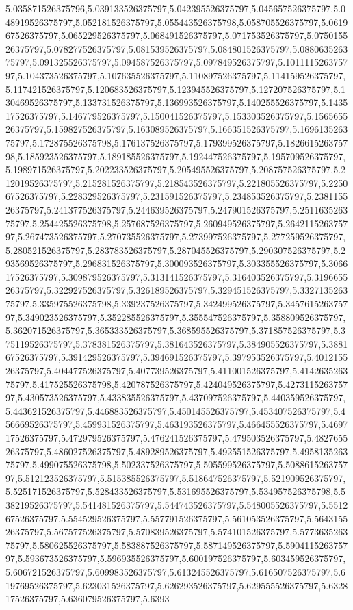 5.035871526375796,5.039133526375797,5.042395526375797,5.045657526375797,5.048919526375797,5.052181526375797,5.055443526375798,5.058705526375797,5.061967526375797,5.065229526375797,5.068491526375797,5.071753526375797,5.075015526375797,5.078277526375797,5.081539526375797,5.084801526375797,5.088063526375797,5.091325526375797,5.094587526375797,5.097849526375797,5.101111526375797,5.104373526375797,5.107635526375797,5.110897526375797,5.114159526375797,5.117421526375797,5.120683526375797,5.123945526375797,5.127207526375797,5.130469526375797,5.133731526375797,5.136993526375797,5.140255526375797,5.143517526375797,5.146779526375797,5.150041526375797,5.153303526375797,5.156565526375797,5.159827526375797,5.163089526375797,5.166351526375797,5.169613526375797,5.172875526375798,5.176137526375797,5.179399526375797,5.182661526375798,5.185923526375797,5.189185526375797,5.192447526375797,5.195709526375797,5.198971526375797,5.202233526375797,5.205495526375797,5.208757526375797,5.212019526375797,5.215281526375797,5.218543526375797,5.221805526375797,5.225067526375797,5.228329526375797,5.231591526375797,5.234853526375797,5.238115526375797,5.241377526375797,5.244639526375797,5.247901526375797,5.251163526375797,5.254425526375798,5.257687526375797,5.260949526375797,5.264211526375797,5.267473526375797,5.270735526375797,5.273997526375797,5.277259526375797,5.280521526375797,5.283783526375797,5.287045526375797,5.290307526375797,5.293569526375797,5.296831526375797,5.300093526375797,5.303355526375797,5.306617526375797,5.309879526375797,5.313141526375797,5.316403526375797,5.319665526375797,5.322927526375797,5.326189526375797,5.329451526375797,5.332713526375797,5.335975526375798,5.339237526375797,5.342499526375797,5.345761526375797,5.349023526375797,5.352285526375797,5.355547526375797,5.358809526375797,5.362071526375797,5.365333526375797,5.368595526375797,5.371857526375797,5.375119526375797,5.378381526375797,5.381643526375797,5.384905526375797,5.388167526375797,5.391429526375797,5.394691526375797,5.397953526375797,5.401215526375797,5.404477526375797,5.407739526375797,5.411001526375797,5.414263526375797,5.417525526375798,5.420787526375797,5.424049526375797,5.427311526375797,5.430573526375797,5.433835526375797,5.437097526375797,5.440359526375797,5.443621526375797,5.446883526375797,5.450145526375797,5.453407526375797,5.456669526375797,5.459931526375797,5.463193526375797,5.466455526375797,5.469717526375797,5.472979526375797,5.476241526375797,5.479503526375797,5.482765526375797,5.486027526375797,5.489289526375797,5.492551526375797,5.495813526375797,5.499075526375798,5.502337526375797,5.505599526375797,5.508861526375797,5.512123526375797,5.515385526375797,5.518647526375797,5.521909526375797,5.525171526375797,5.528433526375797,5.531695526375797,5.534957526375798,5.538219526375797,5.541481526375797,5.544743526375797,5.548005526375797,5.551267526375797,5.554529526375797,5.557791526375797,5.561053526375797,5.564315526375797,5.567577526375797,5.570839526375797,5.574101526375797,5.577363526375797,5.580625526375797,5.583887526375797,5.587149526375797,5.590411526375797,5.593673526375797,5.596935526375797,5.600197526375797,5.603459526375797,5.606721526375797,5.609983526375797,5.613245526375797,5.616507526375797,5.619769526375797,5.623031526375797,5.626293526375797,5.629555526375797,5.632817526375797,5.636079526375797,5.6393